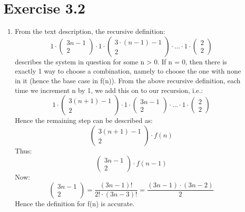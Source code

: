 \section{Exercise 3.2} 
\renewcommand{\labelenumi}{\alph{enumi})}
\begin{enumerate}
\item
From the text description, the recursive definition: \[ 1 \cdot \begin{pmatrix} 3n - 1 \\ 2 \end{pmatrix} \cdot 1 \cdot \begin{pmatrix} 3 \cdot (n - 1) - 1 \\ 2 \end{pmatrix} \cdot ... \cdot 1 \cdot \begin{pmatrix} 2 \\ 2 \end{pmatrix} \] describes the system in question for some n > 0. If n = 0, then there is exactly 1 way to choose a combination, namely to choose the one with none in it (hence the base case in f(n)). From the above recursive definition, each time we increment n by 1, we add this on to our recursion, i.e.:
\[1 \cdot \begin{pmatrix} 3(n+1) - 1 \\ 2 \end{pmatrix} \cdot 1 \cdot \begin{pmatrix} 3n - 1 \\ 2 \end{pmatrix} \cdot ... \cdot 1 \cdot \begin{pmatrix} 2 \\ 2 \end{pmatrix} \]
Hence the remaining step can be described as:
\[ \begin{pmatrix} 3(n + 1) - 1 \\ 2 \end{pmatrix} \cdot f(n) \]
Thus: \[ \begin{pmatrix} 3n - 1 \\ 2 \end{pmatrix} \cdot f(n-1) \]Now: \[ \begin{pmatrix} 3n - 1 \\ 2 \end{pmatrix} = \frac{(3n-1)!}{2!\cdot(3n-3)!} = \frac{(3n-1)\cdot(3n-2)}{2} \] Hence the definition for f(n) is accurate.


\end{enumerate}
